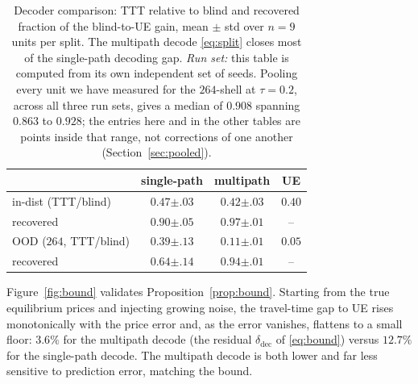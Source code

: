 \documentclass[journal]{IEEEtran}
\begin{document}
\begin{table}[t]
\centering\footnotesize\setlength{\tabcolsep}{3pt}
\caption{Decoder comparison: TTT relative to blind and recovered fraction of the
blind-to-UE gain, mean $\pm$ std over $n{=}9$ units per split. The multipath decode \eqref{eq:split} closes most of the single-path
decoding gap. \emph{Run set:} this table is computed from its own independent set of seeds. Pooling every unit we have measured for the $264$-shell at $\tau=0.2$, across all three run sets, gives a median of $0.908$ spanning $0.863$ to $0.928$; the entries here and in the other tables are points inside that range, not corrections of one another (Section~\ref{sec:pooled}).}
\label{tab:decode}
\begin{tabular}{lccc}
\toprule
 & single-path & multipath & UE \\
\midrule
in-dist (TTT/blind) & $0.47{\scriptstyle\pm.03}$ & $\mathbf{0.42{\scriptstyle\pm.03}}$ & $0.40$ \\
\quad recovered & $0.90{\scriptstyle\pm.05}$ & $\mathbf{0.97{\scriptstyle\pm.01}}$ & -- \\
OOD ($264$, TTT/blind) & $0.39{\scriptstyle\pm.13}$ & $\mathbf{0.11{\scriptstyle\pm.01}}$ & $0.05$ \\
\quad recovered & $0.64{\scriptstyle\pm.14}$ & $\mathbf{0.94{\scriptstyle\pm.01}}$ & -- \\
\bottomrule
\end{tabular}
\end{table}

Figure~\ref{fig:bound} validates Proposition~\ref{prop:bound}. Starting from the true
equilibrium prices and injecting growing noise, the travel-time gap to UE rises
monotonically with the price error and, as the error vanishes, flattens to a small floor:
$3.6\%$ for the multipath decode (the residual $\delta_{\mathrm{dec}}$ of
\eqref{eq:bound}) versus $12.7\%$ for the single-path decode. The multipath decode is
both lower and far less sensitive to prediction error, matching the bound.
\end{document}
